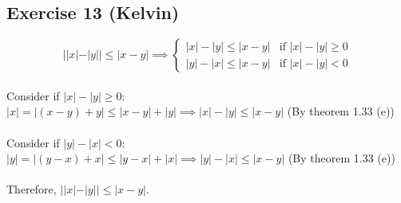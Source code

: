 \subsection*{Exercise 13 (Kelvin)}

\begin{equation}
    ||x| - |y|| \le |x - y| \implies
        \begin{cases}
            |x| - |y| \le |x - y| & \text{if $|x| - |y| \ge 0$}\\
            |y| - |x| \le |x - y| & \text{if $|x| - |y| < 0$}
        \end{cases}
\end{equation} \\
Consider if $|x| - |y| \ge 0$: \\
$|x| = |(x - y) + y| \le |x - y| + |y| \implies |x| - |y| \le |x - y|$ (By theorem 1.33 (e)) \\ \\
Consider if $|y| - |x| < 0$: \\
$|y| = |(y - x) + x| \le |y - x| + |x| \implies |y| - |x| \le |x - y|$ (By theorem 1.33 (e)) \\ \\
Therefore, $||x| - |y|| \le |x - y|$.
    
